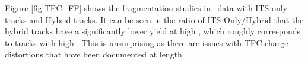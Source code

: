 Figure \ref{fig:TPC_FF} shows the fragmentation studies in \pPb~data with ITS only tracks and Hybrid tracks. It can be seen in the ratio of ITS Only/Hybrid that the hybrid tracks have a significantly lower yield at high \zt, which roughly corresponds to tracks with high \pt. This is unsurprising as there are issues with TPC charge distortions that have been documented at length \cite{zotero-348}.



